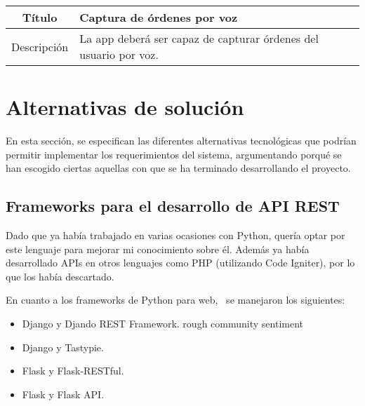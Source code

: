 \begin{center}
  
  \begin{tabularx}{\textwidth}{|c|X|}
    \hline
    Título & Captura de órdenes por voz \\

    \hline

    Descripción & La app deberá ser capaz de capturar órdenes del usuario por
    voz.\\

    \hline
  \end{tabularx}
  \label{tab:accesibilidad}
\end{center}


\section{Alternativas de solución}
\label{sec:alternativas-solucion}

En esta sección, se especifican las diferentes alternativas tecnológicas que
podrían permitir implementar los requerimientos del sistema, argumentando porqué
se han escogido ciertas aquellas con que se ha terminado desarrollando el
proyecto.

\subsection{Frameworks para el desarrollo de API REST}

Dado que ya había trabajado en varias ocasiones con Python, quería optar por este
lenguaje para mejorar mi conocimiento sobre él. Además ya había desarrollado
APIs en otros lenguajes como PHP (utilizando Code Igniter), por lo que los había
descartado.

En cuanto a los frameworks de Python para web,~\cite{api-python} se manejaron
los siguientes:
\begin{itemize}
\item Django y Djando REST Framework. rough community sentiment
 
\item Django y Tastypie.

\item Flask y Flask-RESTful.
\item Flask y Flask API.
\end{itemize}
